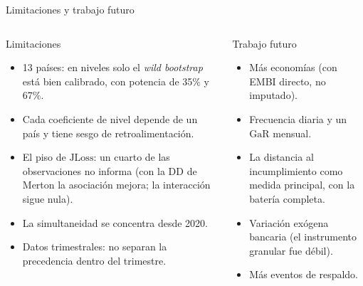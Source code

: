 \documentclass[aspectratio=169]{beamer}
\newcommand{\JLoss}{\mathrm{JLoss}}
\newcommand{\GaR}{\mathrm{GaR}}
\begin{document}
\begin{frame}{Limitaciones y trabajo futuro}
\begin{columns}[T]
\begin{alertblock}{Limitaciones}
\small
\begin{itemize}
\item 13 países: en niveles solo el \textit{wild bootstrap} está bien calibrado, con potencia de 35\% y 67\%.
\item Cada coeficiente de nivel depende de un país y tiene sesgo de retroalimentación.
\item El piso de $\JLoss$: un cuarto de las observaciones no informa (con la DD de Merton la asociación mejora; la interacción sigue nula).
\item La simultaneidad se concentra desde 2020.
\item Datos trimestrales: no separan la precedencia dentro del trimestre.
\end{itemize}
\end{alertblock}
\begin{block}{Trabajo futuro}
\small
\begin{itemize}
\item Más economías (con EMBI directo, no imputado).
\item Frecuencia diaria y un $\GaR$ mensual.
\item La distancia al incumplimiento como medida principal, con la batería completa.
\item Variación exógena bancaria (el instrumento granular fue débil).
\item Más eventos de respaldo.
\end{itemize}
\end{block}
\end{columns}
\end{frame}
\end{document}
